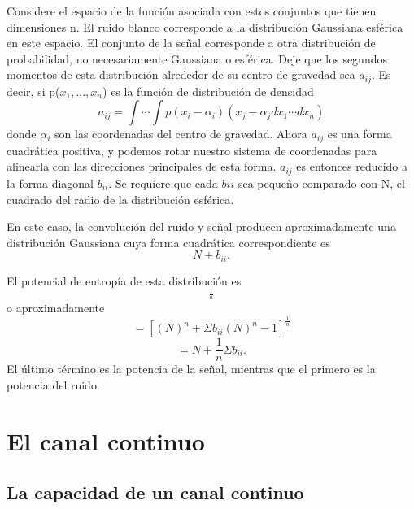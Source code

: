 	Considere el espacio de la funci\'on asociada con estos
	conjuntos que tienen dimensiones n. El ruido blanco
	corresponde a la distribuci\'on Gaussiana esf\'erica en este
	espacio. El conjunto de la se\~nal corresponde a otra
	distribuci\'on de probabilidad, no necesariamente Gaussiana o
	esf\'erica. Deje que los segundos momentos de esta
	distribuci\'on alrededor de su centro de gravedad sea
	$a_{ij}$.  Es decir, si p($x_{1},...,x_{n}$) es la funci\'on
	de distribuci\'on de densidad \begin{equation}
	a_{ij}=\int \cdots \int
	p(x_{i}-\alpha_{i})(x_{j}-\alpha_{j}dx_{1} \cdots
	dx_{n}) \end{equation} donde $\alpha_{i}$ son las coordenadas
	del centro de gravedad. Ahora $a_{ij}$ es una forma
	cuadr\'atica positiva, y podemos rotar nuestro sistema de
	coordenadas para alinearla con las direcciones principales de
	esta forma. $a_{ij}$ es entonces reducido a la forma diagonal
	$b_{ii}$. Se requiere que cada $b{ii}$ sea peque\~no comparado
	con N, el cuadrado del radio de la distribuci\'on esf\'erica.
	
	En este caso, la convoluci\'on del ruido y se\~nal producen
	aproximadamente una distribuci\'on Gaussiana cuya forma
	cuadr\'atica correspondiente es \begin{equation} N +
	b_{ii}.  \end{equation}
	
	El potencial de entrop\'ia de esta distribuci\'on
	es \begin{equation} [\Pi(N +
	b_{ii})]^\frac{1}{n} \end{equation} o
	aproximadamente \begin{equation} = [(N)^n + \Sigma
	b_{ii}(N)^n-1]^\frac{1}{n} \end{equation} \begin{equation} = N
	+ \frac{1}{n}\Sigma b_{ii}.  \end{equation} El \'ultimo
	t\'ermino es la potencia de la se\~nal, mientras que el
	primero es la potencia del ruido.
	
	
	\chapter{El canal continuo}
	
\section{La capacidad de un canal continuo}	
	
